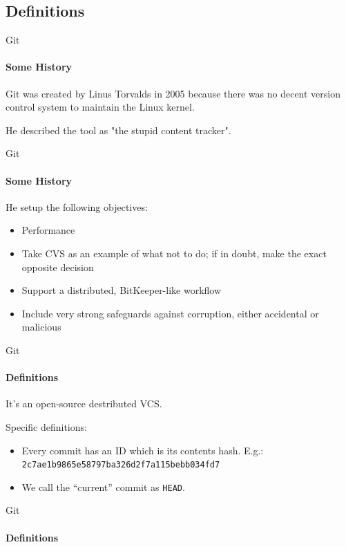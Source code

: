 \documentclass{beamer}
\begin{document}
\subsection{Definitions}
\begin{frame}{Git}
\framesubtitle{Some History}
Git was created by Linus Torvalds in 2005 because there was no decent version control system to maintain the Linux kernel.

He described the tool as "the stupid content tracker".
\end{frame}

\begin{frame}{Git}
\framesubtitle{Some History}
He setup the following objectives:
\begin{itemize}
	\item Performance
	\item Take CVS as an example of what not to do; if in doubt, make the exact opposite decision
	\item Support a distributed, BitKeeper-like workflow
	\item Include very strong safeguards against corruption, either accidental or malicious
\end{itemize}
\end{frame}

\begin{frame}{Git}
\framesubtitle{Definitions}

It's an open-source destributed VCS.

Specific definitions:
\begin{itemize}
	\item Every commit has an ID which is its contents hash. E.g.: \texttt{2c7ae1b9865e58797ba326d2f7a115bebb034fd7}
	\item We call the ``current'' commit as \alert{\texttt{HEAD}}.
\end{itemize}

\end{frame}

\begin{frame}{Git}
\framesubtitle{Definitions}

\centering
{}

\end{frame}
\end{document}
